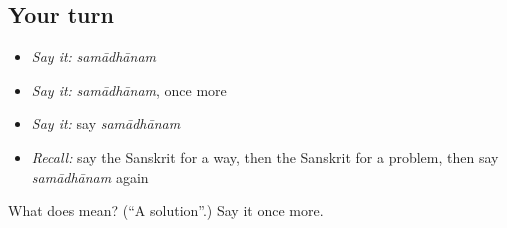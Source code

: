 \subsection*{Your turn}
\begin{itemize}
\raggedright
  \item \emph{Say it:} \emph{samādhānam}
  \item \emph{Say it:} \emph{samādhānam}, once more
  \item \emph{Say it:} say \emph{samādhānam}
  \item \emph{Recall:} say the Sanskrit for a way, then the Sanskrit for a problem, then say \emph{samādhānam} again
\end{itemize}

\begin{tcolorbox}[breakable,colback=teal!4,colframe=teal!35!black,title={Before you move on}]
What does  mean? (\textquotedblleft{}A solution\textquotedblright{}.) Say it once more.
\end{tcolorbox}
